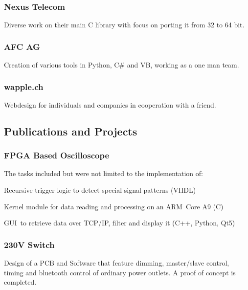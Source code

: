 \documentclass[]{resume}
\begin{document}
\begin{timeline}
\subsubsection{Nexus Telecom}
Diverse work on their main C library with focus on porting it from 32 to 64 bit.
\sectionsep

\subsubsection{AFC AG}
Creation of various tools in Python, C\# and VB, working as a one man team.
\sectionsep

\subsubsection{wapple.ch}
Webdesign for individuals and companies in cooperation with a friend.
\sectionsep


\subsection{Publications and Projects}

\subsubsection{FPGA Based Oscilloscope}
The tasks included but were not limited to the implementation of:
\begin{tightemize}
\item Recursive trigger logic to detect special signal patterns (VHDL)
\item Kernel module for data reading and processing on an ARM Core A9 (C)
\item GUI to retrieve data over TCP/IP, filter and display it (C++, Python, Qt5)
\end{tightemize}
\sectionsep

\subsubsection{230V Switch}
Design of a PCB and Software that feature dimming, master/slave control, timing and bluetooth control of ordinary power outlets. A proof of concept is completed.
\sectionsep


\end{timeline}
\end{document}
